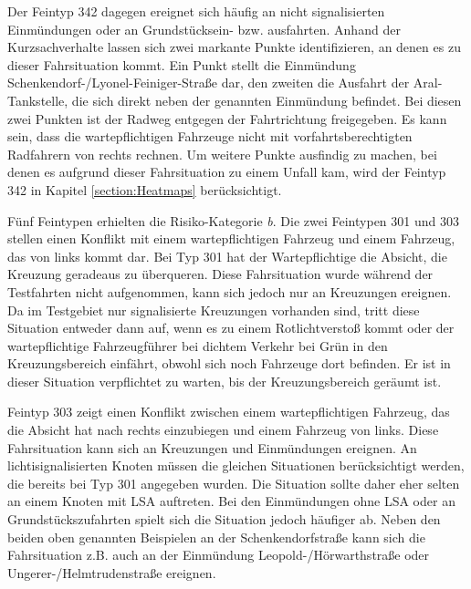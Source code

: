 Der Feintyp 342 dagegen ereignet sich häufig an nicht signalisierten Einmündungen oder an Grundstücksein- bzw. ausfahrten. Anhand der Kurzsachverhalte lassen sich zwei markante Punkte identifizieren, an denen es zu dieser Fahrsituation kommt. Ein Punkt stellt die Einmündung Schenkendorf-/Lyonel-Feiniger-Straße dar, den zweiten die Ausfahrt der Aral-Tankstelle, die sich direkt neben der genannten Einmündung befindet. Bei diesen zwei Punkten ist der Radweg entgegen der Fahrtrichtung freigegeben. Es kann sein, dass die wartepflichtigen Fahrzeuge nicht mit vorfahrtsberechtigten Radfahrern von rechts rechnen. Um weitere Punkte ausfindig zu machen, bei denen es aufgrund dieser Fahrsituation zu einem Unfall kam, wird der Feintyp 342 in Kapitel \ref{section:Heatmaps} berücksichtigt.

Fünf Feintypen erhielten die Risiko-Kategorie \textit{b}. Die zwei Feintypen 301 und 303 stellen einen Konflikt mit einem wartepflichtigen Fahrzeug und einem Fahrzeug, das von links kommt dar. Bei Typ 301 hat der Wartepflichtige die Absicht, die Kreuzung geradeaus zu überqueren. Diese Fahrsituation wurde während der Testfahrten nicht aufgenommen, kann sich jedoch nur an Kreuzungen ereignen. Da im Testgebiet nur signalisierte Kreuzungen vorhanden sind, tritt diese Situation entweder dann auf, wenn es zu einem Rotlichtverstoß kommt oder der wartepflichtige Fahrzeugführer bei dichtem Verkehr bei Grün in den Kreuzungsbereich einfährt, obwohl sich noch Fahrzeuge dort befinden. Er ist in dieser Situation verpflichtet zu warten, bis der Kreuzungsbereich geräumt ist.

Feintyp 303 zeigt einen Konflikt zwischen einem wartepflichtigen Fahrzeug, das die Absicht hat nach rechts einzubiegen und einem Fahrzeug von links. Diese Fahrsituation kann sich an Kreuzungen und Einmündungen ereignen. An lichtisignalisierten Knoten müssen die gleichen Situationen berücksichtigt werden, die bereits bei Typ 301 angegeben wurden. Die Situation sollte daher eher selten an einem Knoten mit \ac{LSA} auftreten. Bei den Einmündungen ohne \ac{LSA} oder an Grundstückszufahrten spielt sich die Situation jedoch häufiger ab. Neben den beiden oben genannten Beispielen an der Schenkendorfstraße kann sich die Fahrsituation z.B. auch an der Einmündung Leopold-/Hörwarthstraße oder Ungerer-/Helmtrudenstraße ereignen.

